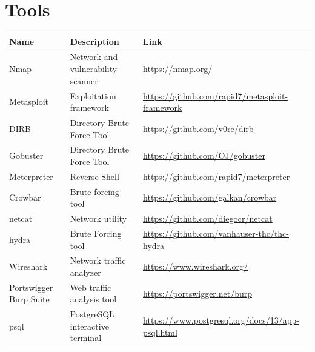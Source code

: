 \section{Tools}
    \begin{table}[H]
    \renewcommand{\arraystretch}{1.25}
        \centering
        \begin{tabular}{|l|p{12em}|p{18em}|}\hline
            \textbf{Name} & \textbf{Description} & \textbf{Link} \\\hline
            Nmap & Network and vulnerability scanner & \url{https://nmap.org/} \\\hline
            Metasploit & Exploitation framework & \url{https://github.com/rapid7/metasploit-framework} \\\hline
            DIRB & Directory Brute Force Tool & \url{https://github.com/v0re/dirb} \\\hline
            Gobuster & Directory Brute Force Tool & \url{https://github.com/OJ/gobuster} \\\hline
            Meterpreter & Reverse Shell & \url{https://github.com/rapid7/meterpreter} \\\hline
            Crowbar & Brute forcing tool & \url{https://github.com/galkan/crowbar} \\\hline
            netcat & Network utility & \url{https://github.com/diegocr/netcat}\\\hline
            hydra & Brute Forcing tool & \url{https://github.com/vanhauser-thc/thc-hydra}\\\hline
            Wireshark & Network traffic analyzer & \url{https://www.wireshark.org/}\\\hline
            Portswigger Burp Suite & Web traffic analysis tool & \url{https://portswigger.net/burp} \\\hline
            psql & PostgreSQL interactive terminal & \url{https://www.postgresql.org/docs/13/app-psql.html} \\ \hline
        \end{tabular}
    \end{table}